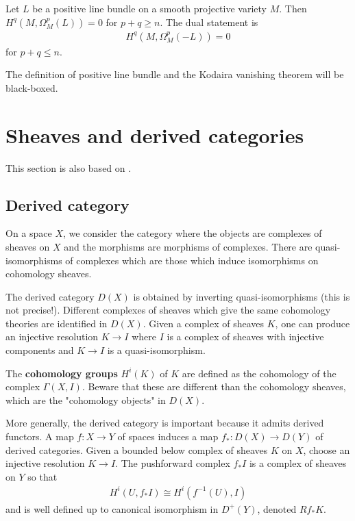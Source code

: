 \documentclass[12pt]{article}
\begin{document}
\begin{theorem}
     Let $L$ be a positive line bundle on a smooth projective variety $M$.
    Then $H^q(M,\Omega^p_M(L)) = 0$ for $p+q \geq n$. The dual statement is \begin{align*}
        H^q(M,\Omega^p_M(-L)) = 0
    \end{align*} for $p+q \leq n$.
\end{theorem}

\begin{remark}
    The definition of positive line bundle and the Kodaira vanishing theorem will be black-boxed.
\end{remark}

\section{Sheaves and derived categories}
This section is also based on \cite{cataldo-migliorini}.

\subsection{Derived category}
On a space $X$, we consider the category where the objects are
complexes of sheaves on $X$ and the morphisms are morphisms of complexes.
There are quasi-isomorphisms of complexes which are those which induce isomorphisms on
cohomology sheaves.

The derived category $D(X)$ is obtained by inverting quasi-isomorphisms (this is not precise!).
Different complexes of sheaves which give the same cohomology theories are identified in $D(X)$.
Given a complex of sheaves $K$, one can produce an injective resolution $K\to I$ where $I$ is a
complex of sheaves with injective components and $K\to I$ is a quasi-isomorphism.

\begin{definition}
    The \textbf{cohomology groups} $H^i(K)$ of $K$ are defined as the cohomology of the complex $\Gamma(X,I)$. Beware that these are different than the cohomology sheaves, which are the "cohomology objects" in $D(X)$.
\end{definition}

More generally, the derived category is important because it admits derived functors. A map
$f:X\to Y$ of spaces induces a map $f_*:D(X)\to D(Y)$ of derived categories. Given
a bounded below complex of sheaves $K$ on $X$, choose an injective resolution $K\to I$.
The pushforward complex $f_*I$ is a complex of sheaves on $Y$ so that \begin{align*}
    H^i(U,f_*I) \cong H^i(f^{-1}(U),I)
\end{align*}
and is well defined up to canonical isomorphism in $D^+(Y)$, denoted $Rf_*K$.
\end{document}
